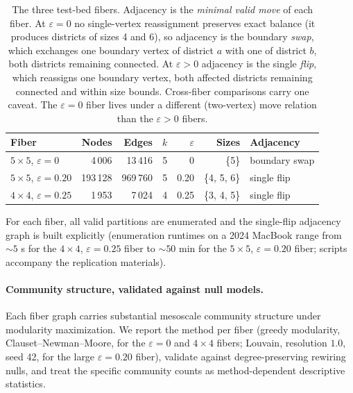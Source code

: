 \documentclass[11pt]{article}
\begin{document}
\begin{table}[H]
\centering
\small
\begin{tabular}{lrrrrrl}
\toprule
Fiber & Nodes & Edges & $k$ & $\varepsilon$ & Sizes & Adjacency \\
\midrule
$5 \times 5$, $\varepsilon = 0$    & 4\,006   & 13\,416  & 5 & 0    & \{5\}       & boundary swap \\
$5 \times 5$, $\varepsilon = 0.20$ & 193\,128 & 969\,760 & 5 & 0.20 & \{4, 5, 6\} & single flip \\
$4 \times 4$, $\varepsilon = 0.25$ & 1\,953   & 7\,024   & 4 & 0.25 & \{3, 4, 5\} & single flip \\
\bottomrule
\end{tabular}
\caption{The three test-bed fibers. Adjacency is the \emph{minimal
  valid move} of each fiber. At $\varepsilon = 0$ no single-vertex
  reassignment preserves exact balance (it produces districts of sizes
  4 and 6), so adjacency is the boundary \emph{swap}, which exchanges one
  boundary vertex of district $a$ with one of district $b$, both
  districts remaining connected. At $\varepsilon > 0$ adjacency is the
  single \emph{flip}, which reassigns one boundary vertex, both affected
  districts remaining connected and within size bounds. Cross-fiber
  comparisons carry one caveat. The $\varepsilon = 0$
  fiber lives under a different (two-vertex) move relation than the
  $\varepsilon > 0$ fibers.}\label{tab:fibers}
\end{table}

For each fiber, all valid partitions are enumerated and the single-flip
adjacency graph is built explicitly (enumeration runtimes on a 2024
MacBook range from $\sim 5$ s for the $4 \times 4$,
$\varepsilon = 0.25$ fiber to $\sim 50$ min for the $5 \times 5$,
$\varepsilon = 0.20$ fiber; scripts accompany the replication
materials).

\paragraph{Community structure, validated against null models.}\label{sec:fiber-islands}

Each fiber graph carries substantial mesoscale community structure
under modularity maximization. We report the method per fiber (greedy
modularity, Clauset--Newman--Moore, for the $\varepsilon = 0$ and
$4 \times 4$ fibers; Louvain, resolution $1.0$, seed 42, for the large
$\varepsilon = 0.20$ fiber), validate against degree-preserving
rewiring nulls, and treat the specific community counts as
method-dependent descriptive statistics.
\end{document}
